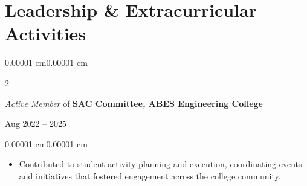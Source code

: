\documentclass[10pt, letterpaper]{article}
\newenvironment{highlights}{
    \begin{itemize}[
        topsep=0.10 cm,
        parsep=0.10 cm,
        partopsep=0pt,
        itemsep=0.02 cm,
        leftmargin=15pt
    ]
}{
    \end{itemize}
}
\newenvironment{onecolentry}{
    \begin{adjustwidth}{0.00001 cm}{0.00001 cm}
}{
    \end{adjustwidth}
}
\newenvironment{twocolentry}[2][]{
    \onecolentry
    \def\secondColumn{#2}
    \setcolumnwidth{\fill, 4.5 cm}
    \begin{paracol}{2}
}{
    \switchcolumn \raggedleft \secondColumn
    \end{paracol}
    \endonecolentry
}
\begin{document}
\section{Leadership \& Extracurricular Activities}

\begin{twocolentry}{Aug 2022 -- 2025}
\textit{Active Member} of \textbf{SAC Committee, ABES Engineering College}
\end{twocolentry}

\begin{onecolentry}
\begin{highlights}
\item Contributed to student activity planning and execution, coordinating events and initiatives that fostered engagement across the college community.
\end{highlights}
\end{onecolentry}
\end{document}
